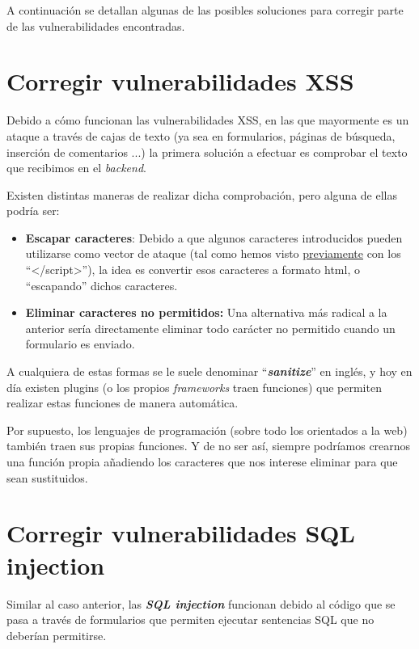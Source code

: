 \documentclass{\ClassPath/viu-tfm-template}
\begin{document}
A continuación se detallan algunas de las posibles soluciones para corregir parte de las vulnerabilidades encontradas.

\section{Corregir vulnerabilidades XSS}
Debido a cómo funcionan las vulnerabilidades XSS, en las que mayormente es un ataque a través de cajas de texto (ya sea en formularios, páginas de búsqueda, inserción de comentarios ...) la primera solución a efectuar es comprobar el texto que recibimos en el \textit{backend}.

Existen distintas maneras de realizar dicha comprobación, pero alguna de ellas podría ser:

\begin{itemize}
    \item \textbf{Escapar caracteres}: Debido a que algunos caracteres introducidos pueden utilizarse como vector de ataque (tal como hemos visto \hyperlink{vulnerabilidad_xss}{previamente} con los “</script>”), la idea es convertir esos caracteres a formato html, o “escapando” dichos caracteres.

    \item \textbf{Eliminar caracteres no permitidos:} Una alternativa más radical a la anterior sería directamente eliminar todo carácter no permitido cuando un formulario es enviado.
\end{itemize}

A cualquiera de estas formas  se le suele denominar “\textbf{\textit{sanitize}}” en inglés, y hoy en día existen plugins (o los propios \textit{frameworks} traen funciones) que permiten realizar estas funciones de manera automática.

Por supuesto, los lenguajes de programación (sobre todo los orientados a la web) también traen sus propias funciones. Y de no ser así, siempre podríamos crearnos una función propia añadiendo los caracteres que nos interese eliminar para que sean sustituidos.


\section{Corregir vulnerabilidades SQL injection}

Similar al caso anterior, las \textbf{\textit{SQL injection}} funcionan debido al código que se pasa a través de formularios que permiten ejecutar sentencias SQL que no deberían permitirse.
\end{document}
